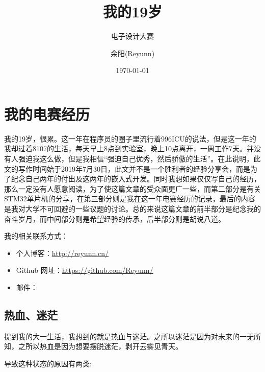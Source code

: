 \documentclass[cn,11pt]{elegantbook}
\title{我的19岁}
\subtitle{电子设计大赛}
\author{余阳(Reyunn)}
\institute{武汉理工大学电子科技协会}
\date{\today}
\begin{document}
\maketitle
\tableofcontents


\mainmatter
\hypersetup{pageanchor=true}

\chapter{我的电赛经历}

我的19岁，很累。这一年在程序员的圈子里流行着996ICU的说法，但是这一年的我却过着8107的生活，每天早上8点到实验室，晚上10点离开，一周工作7天。并没有人强迫我这么做，但是我相信“强迫自己优秀，然后骄傲的生活”。在此说明，此文的写作时间始于2019年7月30日，此文并不是一个胜利者的经验分享会，而是为了纪念自己两年的付出及这两年的嵌入式开发。同时我想如果仅仅写自己的经历，那么一定没有人愿意阅读，为了使这篇文章的受众面更广一些，而第二部分是有关STM32单片机的分享，在第三部分则是我在这一年电赛经历的记录，最后的内容是我对大学不可回避的一些议题的讨论。总的来说这篇文章的前半部分是纪念我的奋斗岁月，而中间部分则是希望经验的传承，后半部分则是胡说八道。

我的相关联系方式：
\begin{itemize}
\item 个人博客：\href{http://reyunn.cn/}{http://reyunn.cn/}
\item Github 网址：\href{https://github.com/Reyunn/}{https://github.com/Reyunn/}
\item 邮件：
\end{itemize}

\section{热血、迷茫}

提到我的大一生活，我想到的就是热血与迷茫。之所以迷茫是因为对未来的一无所知，之所以热血是因为想要摆脱迷茫，剥开云雾见青天。

导致这种状态的原因有两类:
\end{document}

